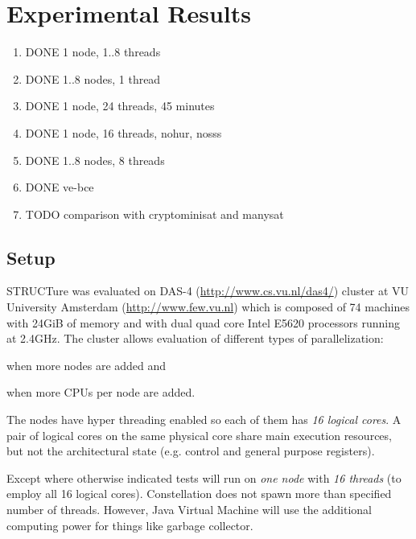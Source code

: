 \chapter{Experimental Results}
\label{chap:results}

\newcommand{\plot}[1]{
  \subfigure{
    \texttt{[image: data/all/\#1]}
  }

  \subfigure{
    \texttt{[image: data/random/\#1]}
  }

  \subfigure{
    \texttt{[image: data/nonrandom/\#1]}
  }
}

\begin{enumerate}
  \item DONE 1 node, 1..8 threads
  \item DONE 1..8 nodes, 1 thread
  \item DONE 1 node, 24 threads, 45 minutes
  \item DONE 1 node, 16 threads, nohur, nosss
  \item DONE 1..8 nodes, 8 threads
  \item DONE ve-bce
  \item TODO comparison with cryptominisat and manysat
\end{enumerate}

\section{Setup}

STRUCTure was evaluated on DAS-4 (\url{http://www.cs.vu.nl/das4/})
cluster at VU University Amsterdam (\url{http://www.few.vu.nl})
which is composed of 74 machines with 24GiB of memory and with
dual quad core Intel E5620 processors running at 2.4GHz. The
cluster allows evaluation of different types of parallelization:
\begin{inparaenum}[1)]
  \item when more nodes are added and
  \item when more CPUs per node are added.
\end{inparaenum}

The nodes have hyper threading enabled so each of them has \emph{16
logical cores}. A pair of logical cores on the same physical core
share main execution resources, but not the architectural state
(e.g. control and general purpose registers).

Except where otherwise indicated tests will run on \emph{one
node} with \emph{16 threads} (to employ all 16 logical
cores). Constellation does not spawn more than specified number
of threads. However, Java Virtual Machine will use the additional
computing power for things like garbage collector.

